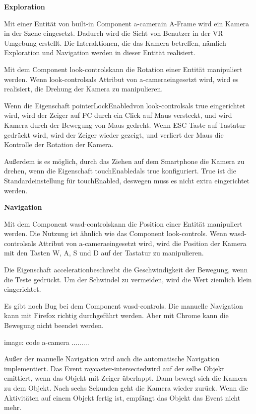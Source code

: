   \textbf{Exploration}
  
  Mit einer Entität von built-in Component \glqq a-camera\grqq in A-Frame wird ein Kamera in der Szene eingesetzt. Dadurch wird die Sicht von Benutzer in der VR Umgebung erstellt. Die Interaktionen, die das Kamera betreffen, nämlich Exploration und Navigation werden in dieser Entität realisiert.
  
  Mit dem Component \glqq look-controls\grqq kann die Rotation einer Entität manipuliert werden. Wenn \grqq look-controls\grqq als Attribut von \glqq a-camera\grqq eingesetzt wird, wird es realisiert, die Drehung der Kamera zu manipulieren.
  
  Wenn die Eigenschaft \glqq pointerLockEnabled\grqq von \glqq look-controls\grqq  als true eingerichtet wird, wird der Zeiger auf PC durch ein Click auf Maus versteckt, und wird Kamera durch der Bewegung von Maus gedreht. Wenn ESC Taste auf Tastatur gedrückt wird, wird der Zeiger wieder gezeigt, und verliert der Maus die Kontrolle der Rotation der Kamera.
  
  Außerdem is es möglich, durch das Ziehen auf dem Smartphone die Kamera zu drehen, wenn die Eigenschaft \glqq touchEnabled\grqq als true konfiguriert. True ist die Standardeinstellung für \glqq touchEnabled\grqq, deswegen muss es nicht extra eingerichtet werden.
  
  \textbf{Navigation}
  
  Mit dem Component \glqq wasd-controls\grqq kann die Position einer Entität manipuliert werden. Die Nutzung ist ähnlich wie das Component \glqq look-controls\grqq. Wenn \grqq wasd-controls\grqq als Attribut von \glqq a-camera\grqq eingesetzt wird, wird die Position der Kamera mit den Tasten W, A, S und D auf der Tastatur zu manipulieren.
  
  Die Eigenschaft \glqq acceleration\grqq beschreibt die Geschwindigkeit der Bewegung, wenn die Teste gedrückt. Um der Schwindel zu vermeiden, wird die Wert ziemlich klein eingerichtet.
  
  Es gibt noch Bug bei dem Component \glqq wasd-controls\grqq. Die manuelle Navigation kann mit Firefox richtig durchgeführt werden. Aber mit Chrome kann die Bewegung nicht beendet werden.
  
  image: code a-camera .........
  
  Außer der manuelle Navigation wird auch die automatische Navigation implementiert. Das Event \glqq raycaster-intersected\grqq wird auf der selbe Objekt emittiert, wenn das Objekt mit Zeiger überlappt. Dann bewegt sich die Kamera zu dem Objekt. Nach sechs Sekunden geht die Kamera wieder zurück. Wenn die Aktivitäten auf einem Objekt fertig ist, empfängt das Objekt das Event nicht mehr.
  

